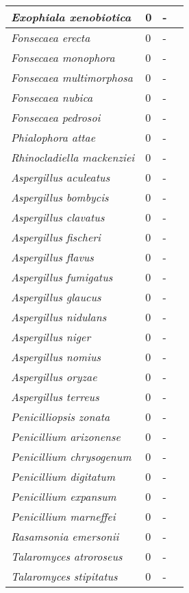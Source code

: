 {\begin{longtable}{| L{4cm} | L{2cm}  | L{5cm} | L{4cm} |}
\textit{Exophiala xenobiotica} & 0 & - & \\ \hline
\textit{Fonsecaea erecta} & 0 & - & \\ \hline
\textit{Fonsecaea monophora} & 0 & - & \\ \hline
\textit{Fonsecaea multimorphosa} & 0 & - & \\ \hline
\textit{Fonsecaea nubica} & 0 & - & \\ \hline
\textit{Fonsecaea pedrosoi} & 0 & - & \\ \hline
\textit{Phialophora attae} & 0 & - & \\ \hline
\textit{Rhinocladiella mackenziei} & 0 & - & \\ \hline
\textit{Aspergillus aculeatus} & 0 & - & \\ \hline
\textit{Aspergillus bombycis} & 0 & - & \\ \hline
\textit{Aspergillus clavatus} & 0 & - & \\ \hline
\textit{Aspergillus fischeri} & 0 & - & \\ \hline
\textit{Aspergillus flavus} & 0 & - & \\ \hline
\textit{Aspergillus fumigatus} & 0 & - & \\ \hline
\textit{Aspergillus glaucus} & 0 & - & \\ \hline
\textit{Aspergillus nidulans} & 0 & - & \\ \hline
\textit{Aspergillus niger} & 0 & - & \\ \hline
\textit{Aspergillus nomius} & 0 & - & \\ \hline
\textit{Aspergillus oryzae} & 0 & - & \\ \hline
\textit{Aspergillus terreus} & 0 & - & \\ \hline
\textit{Penicilliopsis zonata} & 0 & - & \\ \hline
\textit{Penicillium arizonense} & 0 & - & \\ \hline
\textit{Penicillium chrysogenum} & 0 & - & \\ \hline
\textit{Penicillium digitatum} & 0 & - & \\ \hline
\textit{Penicillium expansum} & 0 & - & \\ \hline
\textit{Penicillium marneffei} & 0 & - & \\ \hline
\textit{Rasamsonia emersonii} & 0 & - & \\ \hline
\textit{Talaromyces atroroseus} & 0 & - & \\ \hline
\textit{Talaromyces stipitatus} & 0 & - & \\ \hline

\end{longtable}}
